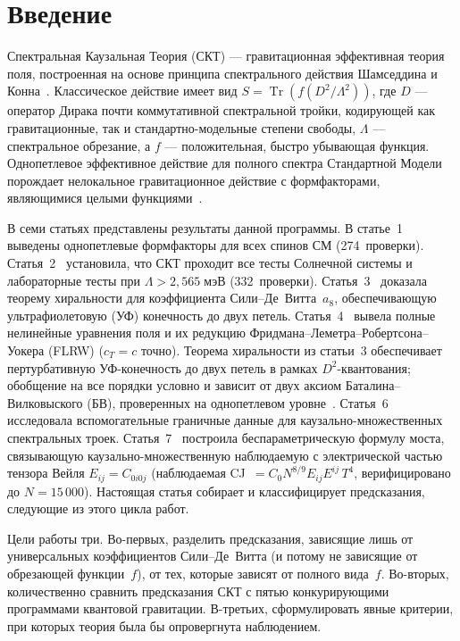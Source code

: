 \documentclass[12pt,a4paper]{article}
\theoremstyle{plain}
\theoremstyle{definition}
\theoremstyle{remark}
\newcommand{\Tr}{\operatorname{Tr}}
\newcommand{\Esq}{E_{ij}E^{ij}}
\begin{document}
\tableofcontents
\newpage

\section{Введение}
\label{sec:intro}

Спектральная Каузальная Теория (СКТ) --- гравитационная эффективная
теория поля, построенная на основе принципа спектрального действия
Шамседдина и Конна~\cite{CC:1996,CC:1997}. Классическое действие
имеет вид $S = \Tr(f(D^2/\Lambda^2))$, где $D$ --- оператор Дирака
почти коммутативной спектральной тройки, кодирующей как гравитационные,
так и стандартно-модельные степени свободы, $\Lambda$ --- спектральное
обрезание, а $f$ --- положительная, быстро убывающая функция.
Однопетлевое эффективное действие для полного спектра Стандартной
Модели порождает нелокальное гравитационное действие с формфакторами,
являющимися целыми функциями~\cite{Alfyorov:2026paper1}.

В семи статьях представлены результаты данной программы. В
статье~1~\cite{Alfyorov:2026paper1} выведены однопетлевые формфакторы
для всех спинов СМ (274~проверки).
Статья~2~\cite{Alfyorov:2026paper2} установила, что СКТ проходит все
тесты Солнечной системы и лабораторные тесты при
$\Lambda > 2{,}565\;\text{мэВ}$ (332~проверки).
Статья~3~\cite{Alfyorov:2026paper3} доказала теорему хиральности
для коэффициента Сили--Де~Витта~$a_8$, обеспечивающую ультрафиолетовую (УФ) конечность
до двух петель.
Статья~4~\cite{Alfyorov:2026paper4} вывела полные нелинейные
уравнения поля и их редукцию Фридмана--Леметра--Робертсона--Уокера (FLRW) ($c_T = c$ точно).
Теорема хиральности из статьи~3 обеспечивает пертурбативную
УФ-конечность до двух петель в рамках $D^2$-квантования; обобщение
на все порядки условно и зависит от двух аксиом Баталина--Вилковыского (БВ), проверенных на
однопетлевом уровне~\cite{Alfyorov:2026paper3}.
Статья~6~\cite{Alfyorov:2026paper6} исследовала вспомогательные
граничные данные для каузально-множественных спектральных троек.
Статья~7~\cite{Alfyorov:2026paper7} построила беспараметрическую
формулу моста, связывающую каузально-множественную наблюдаемую с
электрической частью тензора Вейля $E_{ij} = C_{0i0j}$
(наблюдаемая CJ~$= C_0 N^{8/9} \Esq\, T^4$,
верифицировано до $N = 15\,000$).
Настоящая статья собирает и классифицирует предсказания, следующие
из этого цикла работ.

Цели работы три. Во-первых, разделить предсказания, зависящие лишь
от универсальных коэффициентов Сили--Де~Витта (и потому не зависящие
от обрезающей функции~$f$), от тех, которые зависят от полного
вида~$f$. Во-вторых, количественно сравнить предсказания СКТ с пятью
конкурирующими программами квантовой гравитации. В-третьих,
сформулировать явные критерии, при которых теория была бы
опровергнута наблюдением.
\end{document}
